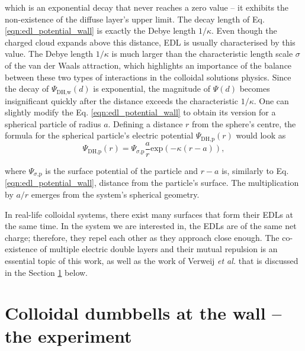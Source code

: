 \documentclass{master_thesis}
\begin{document}
which is an exponential decay that never reaches a zero value -- it exhibits the non-existence of the diffuse layer's upper limit. The decay length of Eq. \eqref{eqn:edl_potential_wall} is exactly the Debye length $1/\kappa$. Even though the charged cloud expands above this distance, EDL is usually characterised by this value. The Debye length $1/\kappa$ is much larger than the characteristic length scale $\sigma$ of the van der Waals attraction, which highlights an importance of the balance between these two types of interactions in the colloidal solutions physics. Since the decay of $\Psi_{\textrm{DH,w}}(d)$ is exponential, the magnitude of $\Psi(d)$ becomes insignificant quickly after the distance exceeds the characteristic $1/\kappa$. One can slightly modify the Eq. \eqref{eqn:edl_potential_wall} to obtain its version for a spherical particle of radius $a$. Defining a distance $r$ from the sphere's centre, the formula for the spherical particle's electric potential $\Psi_{\textrm{DH,p}}(r)$ would look as
\begin{equation}
    \Psi_{\textrm{DH,p}}(r) = \Psi_{\sigma \textrm{,p}} \frac{a}{r} \textrm{exp} \left(-\kappa (r - a) \right),
\label{eqn:edl_potential_sphere}
\end{equation}

where $\Psi_{\sigma \textrm{,p}}$ is the surface potential of the particle and $r-a$ is, similarly to Eq. \eqref{eqn:edl_potential_wall}, distance from the particle's surface. The multiplication by $a/r$ emerges from the system's spherical geometry.

In real-life colloidal systems, there exist many surfaces that form their EDLs at the same time. In the system we are interested in, the EDLs are of the same net charge; therefore, they repel each other as they approach close enough. The co-existence of multiple electric double layers and their mutual repulsion is an essential topic of this work, as well as the work of Verweij \textit{et al.} \cite{verweij2021} that is discussed in the Section \ref{sec:verweij_theory} below.


\section{Colloidal dumbbells at the wall -- the experiment} \label{sec:verweij_theory}
\end{document}
